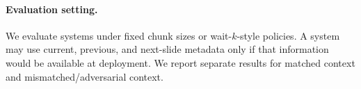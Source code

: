 \paragraph{Evaluation setting.}
We evaluate systems under fixed chunk sizes or wait-$k$-style policies.  A system may use current, previous, and next-slide metadata only if that information would be available at deployment.  We report separate results for matched context and mismatched/adversarial context.
